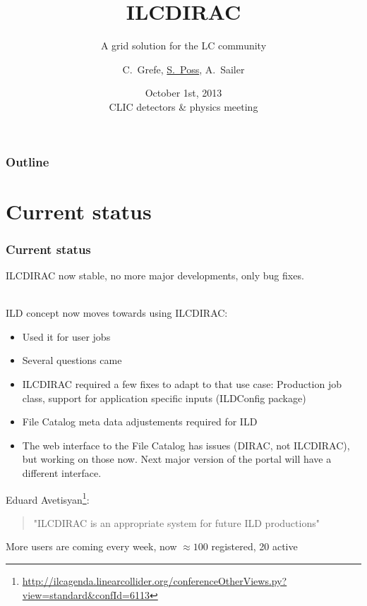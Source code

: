 \documentclass[10pt,table,dvipsnames]{beamer}
\author{C.~Grefe, \underline{S.~Poss}, A.~Sailer}
\title{ILCDIRAC}
\subtitle{A grid solution for the LC community}
\date[Oct. 1st 2013, CLIC dp meeting]{October 1st, 2013\\CLIC detectors \& physics meeting}
\institute{CERN}
\begin{document}
\renewcommand{\inserttotalframenumber}{\ref{lastframe}}
\begin{frame}
\titlepage
\end{frame}

\begin{frame}
\frametitle{Outline}
\tableofcontents
\end{frame}

\section{Current status}
\begin{frame}
\frametitle{Current status}
\alert{ILCDIRAC now stable}, no more major developments, only bug fixes.

~\\

ILD concept now moves towards using ILCDIRAC:
\begin{itemize}
\item Used it for user jobs
\item Several questions came
\item ILCDIRAC required a few fixes to adapt to that use case: Production job class, support for application specific inputs (ILDConfig package)
\item File Catalog meta data adjustements required for ILD
\item The web interface to the File Catalog has issues (DIRAC, not ILCDIRAC), but working on those now. Next major version of the portal will have a different interface.
\end{itemize}
Eduard Avetisyan\footnote{\url{http://ilcagenda.linearcollider.org/conferenceOtherViews.py?view=standard&confId=6113}}:
\begin{quote}
"ILCDIRAC is an appropriate system for future ILD productions"
\end{quote}
More users are coming every week, now $\approx 100$ registered, 20 active
\end{frame}
\end{document}
